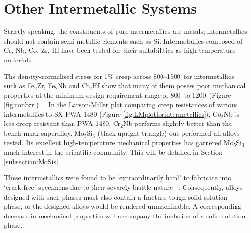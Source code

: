 \section{Other Intermetallic Systems}

Strictly speaking, the constituents of pure intermetallics are metals; intermetallics should not contain semi-metallic elements such as Si.  Intermetallics composed of Cr, Nb, Co, Zr, Hf have been tested for their suitabilities as high-temperature materials.

The density-normalised stress for 1\% creep across 800--1500\celsius\ for intermetallics such as Fe$_2$Zr, Fe$_2$Nb and Cr$_2$Hf show that many of them posess poor mechanical properties at the minimum design requirement range of 800\celsius\ to 1200\celsius\ (Figure \ref{fig:conbzr}) ~\cite{anton92, kumar94hf}.  In the Larson-Miller plot comparing creep resistances of various intermetallics to SX PWA-1480 (Figure \ref{fig:LMplotforintermetallics}), Co$_2$Nb is less creep resistant than PWA-1480.  Cr$_2$Nb performs slightly better than the bench-mark superalloy.  Mo$_5$Si$_3$ (black upright triangle) out-performed all alloys tested.  Its excellent high-temperature mechanical properties has garnered Mo$_5$Si$_3$ much interest in the scientific community.  This will be detailed in Section \ref{subsection:MoSis}.

These intermetallics were found to be `extraordinarily hard' to fabricate into `crack-free' specimens due to their severely brittle nature ~\cite{anton92}.  Consequently, alloys designed with such phases must also contain a fracture-tough solid-solution phase, or the designed alloys would be rendered unmachinable.  A corresponding decrease in mechanical properties will accompany the inclusion of a solid-solution phase.

